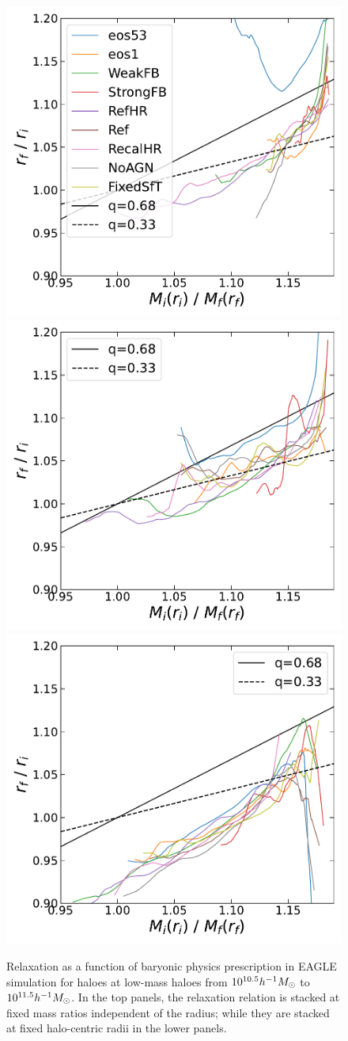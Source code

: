 
\begin{figure}[htbp]
\centering
\includegraphics[width=0.32\linewidth]{plots/eagle_physvar_rad_indep_relxn_reln_MiMf_10.5.pdf}
\includegraphics[width=0.32\linewidth]{plots/eagle_physvar_rad_indep_relxn_reln_MiMf_11.pdf}
\includegraphics[width=0.32\linewidth]{plots/eagle_physvar_rad_indep_relxn_reln_MiMf_11.5.pdf}
\caption[]{Relaxation as a function of baryonic physics prescription in EAGLE simulation for haloes at low-mass haloes from $10^{10.5} h^{-1}M_{\odot}$ to $10^{11.5} h^{-1}M_{\odot}$. In the top panels, the relaxation relation is stacked at fixed mass ratios independent of the radius; while they are stacked at fixed halo-centric radii in the lower panels.}
\label{fig:EAGLE-rad-indep}
\end{figure}

